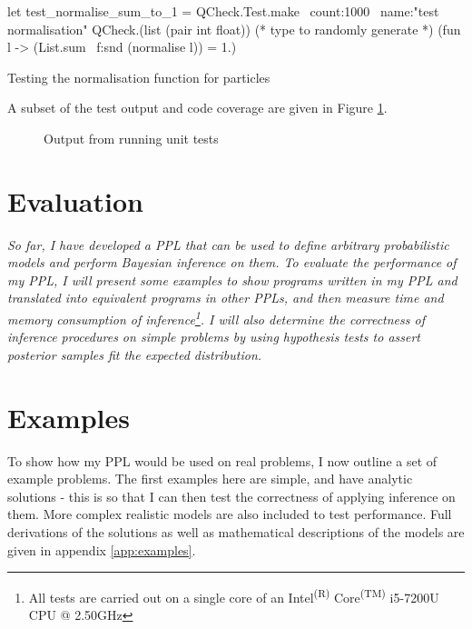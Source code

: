 \documentclass[sigconf]{acmart}
\begin{document}
\begin{listing}[!htb]
  \centering
  \begin{ocamlcode-in}
    let test_normalise_sum_to_1 =
    QCheck.Test.make ~count:1000 ~name:"test normalisation"
    QCheck.(list (pair int float)) (* type to randomly generate *)
    (fun l -> (List.sum ~f:snd (normalise l)) = 1.)
  \end{ocamlcode-in}
  \caption{Testing the normalisation function for particles}
  \label{lst:test}
\end{listing}

A subset of the test output and code coverage are given in Figure \ref{fig:test-out}.

\begin{figure}[!htb]
  \centering
  \hfill
  \caption{Output from running unit tests}
  \label{fig:test-out}
\end{figure}


\section{Evaluation}
\label{s:evaluation}

\textit{So far, I have developed a PPL that can be used to define arbitrary probabilistic models and perform Bayesian inference on them. To evaluate the performance of my PPL, I will present some examples to show programs written in my PPL and translated into equivalent programs in other PPLs, and then measure time and memory consumption of inference\footnote{All tests are carried out on a single core of an Intel\textsuperscript{(R)} Core\textsuperscript{(TM)} i5-7200U CPU @ 2.50GHz}. I will also determine the correctness of inference procedures on simple problems by using hypothesis tests to assert posterior samples fit the expected distribution.}

\section{Examples}
To show how my PPL would be used on real problems, I now outline a set of example problems. The first examples here are simple, and have analytic solutions - this is so that I can then test the correctness of applying inference on them. More complex realistic models are also included to test performance. Full derivations of the solutions as well as mathematical descriptions of the models are given in appendix \ref{app:examples}.
\end{document}
